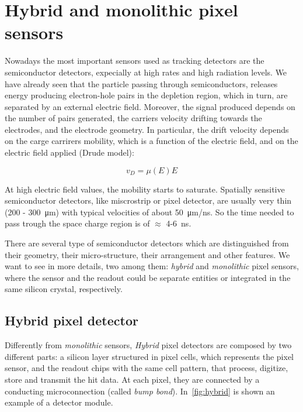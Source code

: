 \section{Hybrid and monolithic pixel sensors}

Nowadays the most important sensors used as tracking detectors are the semiconductor detectors, expecially at high rates and high radiation levels. We have already seen that the particle passing through semiconductors, releases energy producing electron-hole pairs in the depletion region, which in turn, are separated by an external electric field. Moreover, the signal produced depends on the number of pairs generated, the carriers velocity drifting towards the electrodes, and the electrode geometry. 
In particular, the drift velocity depends on the carge carrirers mobility, which is a function of the electric field, and on the electric field applied (Drude model):

\begin{equation}
v_{D} = \mu(E) E
\end{equation}

At high electric field values, the mobility starts to saturate.
Spatially sensitive semiconductor detectors, like miscrostrip or pixel detector, are usually very thin (200 - \SI{300}{\micro m}) with typical velocities of about \SI{50}{\micro m/ns}. So the time needed to pass trough the space charge region is of $\approx$ 4-\SI{6}{ns}. 

There are several type of semiconductor detectors which are distinguished from their geometry, their micro-structure, their arrangement and other features. We want to see in more details, two among them: \emph{hybrid} and \emph{monolithic} pixel sensors, where the sensor and the readout could be separate entities or integrated in the same silicon crystal, respectively.


\subsection{Hybrid pixel detector}

Differently from \textit{monolithic} sensors, \textit{Hybrid} pixel detectors are composed by two different parts: a silicon layer structured in pixel cells, which represents the pixel sensor, and the readout chips with the same cell pattern, that process, digitize, store and transmit the hit data. At each pixel, they are connected by a conducting microconnection (called \emph{bump bond}). In~\autoref{fig:hybrid} is shown an example of a detector module. 


